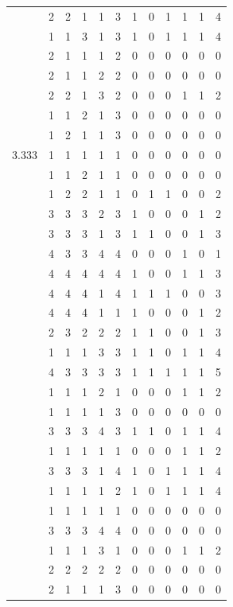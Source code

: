 \documentclass[]{msu-thesis}
\theoremstyle{definition}
\theoremstyle{definition}
\theoremstyle{definition}
\theoremstyle{remark}
\begin{document}
\begin{table}
{\begin{tabular}[t]{rrrrrrrrrrrr}
 & 2 & 2 & 1 & 1 & 3 & 1 & 0 & 1 & 1 & 1 & 4\\
 & 1 & 1 & 3 & 1 & 3 & 1 & 0 & 1 & 1 & 1 & 4\\
 & 2 & 1 & 1 & 1 & 2 & 0 & 0 & 0 & 0 & 0 & 0\\
 & 2 & 1 & 1 & 2 & 2 & 0 & 0 & 0 & 0 & 0 & 0\\
 & 2 & 2 & 1 & 3 & 2 & 0 & 0 & 0 & 1 & 1 & 2\\
 & 1 & 1 & 2 & 1 & 3 & 0 & 0 & 0 & 0 & 0 & 0\\
 & 1 & 2 & 1 & 1 & 3 & 0 & 0 & 0 & 0 & 0 & 0\\
3.333 & 1 & 1 & 1 & 1 & 1 & 0 & 0 & 0 & 0 & 0 & 0\\
 & 1 & 1 & 2 & 1 & 1 & 0 & 0 & 0 & 0 & 0 & 0\\
 & 1 & 2 & 2 & 1 & 1 & 0 & 1 & 1 & 0 & 0 & 2\\
 & 3 & 3 & 3 & 2 & 3 & 1 & 0 & 0 & 0 & 1 & 2\\
 & 3 & 3 & 3 & 1 & 3 & 1 & 1 & 0 & 0 & 1 & 3\\
 & 4 & 3 & 3 & 4 & 4 & 0 & 0 & 0 & 1 & 0 & 1\\
 & 4 & 4 & 4 & 4 & 4 & 1 & 0 & 0 & 1 & 1 & 3\\
 & 4 & 4 & 4 & 1 & 4 & 1 & 1 & 1 & 0 & 0 & 3\\
 & 4 & 4 & 4 & 1 & 1 & 1 & 0 & 0 & 0 & 1 & 2\\
 & 2 & 3 & 2 & 2 & 2 & 1 & 1 & 0 & 0 & 1 & 3\\
 & 1 & 1 & 1 & 3 & 3 & 1 & 1 & 0 & 1 & 1 & 4\\
 & 4 & 3 & 3 & 3 & 3 & 1 & 1 & 1 & 1 & 1 & 5\\
 & 1 & 1 & 1 & 2 & 1 & 0 & 0 & 0 & 1 & 1 & 2\\
 & 1 & 1 & 1 & 1 & 3 & 0 & 0 & 0 & 0 & 0 & 0\\
 & 3 & 3 & 3 & 4 & 3 & 1 & 1 & 0 & 1 & 1 & 4\\
 & 1 & 1 & 1 & 1 & 1 & 0 & 0 & 0 & 1 & 1 & 2\\
 & 3 & 3 & 3 & 1 & 4 & 1 & 0 & 1 & 1 & 1 & 4\\
 & 1 & 1 & 1 & 1 & 2 & 1 & 0 & 1 & 1 & 1 & 4\\
 & 1 & 1 & 1 & 1 & 1 & 0 & 0 & 0 & 0 & 0 & 0\\
 & 3 & 3 & 3 & 4 & 4 & 0 & 0 & 0 & 0 & 0 & 0\\
 & 1 & 1 & 1 & 3 & 1 & 0 & 0 & 0 & 1 & 1 & 2\\
 & 2 & 2 & 2 & 2 & 2 & 0 & 0 & 0 & 0 & 0 & 0\\
 & 2 & 1 & 1 & 1 & 3 & 0 & 0 & 0 & 0 & 0 & 0\\

\end{tabular}}
\end{table}
\end{document}
